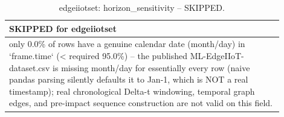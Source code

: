 \begin{table}[t]
\centering
\caption{edgeiiotset: horizon_sensitivity -- SKIPPED.}
\label{tab:edgeiiotset_horizon_sensitivity}
\begin{tabular}{p{0.9\linewidth}}
\toprule
\textbf{SKIPPED for edgeiiotset} \\
\midrule
only 0.0\% of rows have a genuine calendar date (month/day) in `frame.time` (< required 95.0\%) -- the published ML-EdgeIIoT-dataset.csv is missing month/day for essentially every row (naive pandas parsing silently defaults it to Jan-1, which is NOT a real timestamp); real chronological Delta-t windowing, temporal graph edges, and pre-impact sequence construction are not valid on this field. \\
\bottomrule
\end{tabular}
\end{table}
